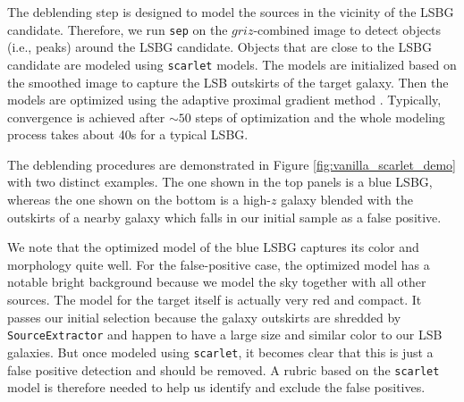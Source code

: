 \documentclass[twocolumn,astrosymb,twocolappendix]{aastex631}
\newcommand{\code}[1]{\texttt{#1}}
\begin{document}
\begin{CJK*}{UTF8}{gbsn}
The deblending step is designed to model the sources in the vicinity of the LSBG candidate. Therefore, we run \code{sep} on the $griz$-combined image to detect objects (i.e., peaks) around the LSBG candidate. Objects that are close to the LSBG candidate are modeled using \code{scarlet} models. The models are initialized based on the smoothed image to capture the LSB outskirts of the target galaxy. Then the models are optimized using the adaptive proximal gradient method \citep{Melchior2019}. Typically, convergence is achieved after $\sim 50$ steps of optimization and the whole modeling process takes about 40s for a typical LSBG.

The deblending procedures are demonstrated in Figure \ref{fig:vanilla_scarlet_demo} with two distinct examples. The one shown in the top panels is a blue LSBG, whereas the one shown on the bottom is a high-$z$ galaxy blended with the outskirts of a nearby galaxy which falls in our initial sample as a false positive. %

We note that the optimized model of the blue LSBG captures its color and morphology quite well. For the false-positive case, the optimized model has a notable bright background because we model the sky together with all other sources. The model for the target itself is actually very red and compact. It passes our initial selection because the galaxy outskirts are shredded by \code{SourceExtractor} and happen to have a large size and similar color to our LSB galaxies. But once modeled using \code{scarlet}, it becomes clear that this is just a false positive detection and should be removed. A rubric based on the \code{scarlet} model is therefore needed to help us identify and exclude the false positives. 




\end{CJK*}
\end{document}
